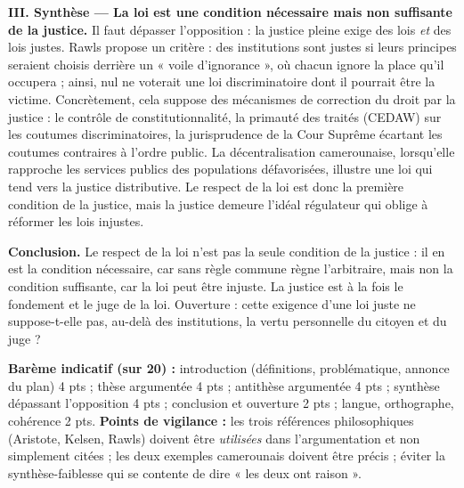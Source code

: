 \documentclass[11pt]{article}
\begin{document}
\begin{corrige}
\textbf{III. Synthèse — La loi est une condition nécessaire mais non suffisante de la justice.} Il faut dépasser l'opposition : la justice pleine exige des lois \emph{et} des lois justes. Rawls propose un critère : des institutions sont justes si leurs principes seraient choisis derrière un « voile d'ignorance », où chacun ignore la place qu'il occupera ; ainsi, nul ne voterait une loi discriminatoire dont il pourrait être la victime. Concrètement, cela suppose des mécanismes de correction du droit par la justice : le contrôle de constitutionnalité, la primauté des traités (CEDAW) sur les coutumes discriminatoires, la jurisprudence de la Cour Suprême écartant les coutumes contraires à l'ordre public. La décentralisation camerounaise, lorsqu'elle rapproche les services publics des populations défavorisées, illustre une loi qui tend vers la justice distributive. Le respect de la loi est donc la première condition de la justice, mais la justice demeure l'idéal régulateur qui oblige à réformer les lois injustes.

\textbf{Conclusion.} Le respect de la loi n'est pas la seule condition de la justice : il en est la condition nécessaire, car sans règle commune règne l'arbitraire, mais non la condition suffisante, car la loi peut être injuste. La justice est à la fois le fondement et le juge de la loi. Ouverture : cette exigence d'une loi juste ne suppose-t-elle pas, au-delà des institutions, la vertu personnelle du citoyen et du juge ?

\textbf{Barème indicatif (sur 20) :} introduction (définitions, problématique, annonce du plan) 4 pts ; thèse argumentée 4 pts ; antithèse argumentée 4 pts ; synthèse dépassant l'opposition 4 pts ; conclusion et ouverture 2 pts ; langue, orthographe, cohérence 2 pts.
\textbf{Points de vigilance :} les trois références philosophiques (Aristote, Kelsen, Rawls) doivent être \emph{utilisées} dans l'argumentation et non simplement citées ; les deux exemples camerounais doivent être précis ; éviter la synthèse-faiblesse qui se contente de dire « les deux ont raison ».
\end{corrige}
\end{document}
